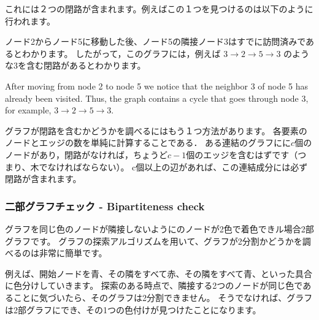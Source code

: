 これには２つの閉路が含まれます。例えばこの１つを見つけるのは以下のように行われます。
\begin{center}
\end{center}


ノード2からノード5に移動した後、ノード5の隣接ノード3はすでに訪問済みであるとわかります。
したがって，このグラフには，例えば
$3 \rightarrow 2 \rightarrow 5 \rightarrow 3$
のような3を含む閉路があるとわかります。

After moving from node 2 to node 5 we notice that
the neighbor 3 of node 5 has already been visited.
Thus, the graph contains a cycle that goes through node 3,
for example, $3 \rightarrow 2 \rightarrow 5 \rightarrow 3$.

グラフが閉路を含むかどうかを調べるにはもう１つ方法があります。
各要素のノードとエッジの数を単純に計算することである．
ある連結のグラフにに$c$個のノードがあり，閉路がなければ，ちょうど$c - 1$個のエッジを含むはずです（つまり、木でなければならない）。
c個以上の辺があれば、この連結成分には必ず閉路が含まれます。


\subsubsection{二部グラフチェック - Bipartiteness check}


グラフを同じ色のノードが隣接しないようにのノードが2色で着色できル場合2部グラフです。
グラフの探索アルゴリズムを用いて、グラフが2分割かどうかを調べるのは非常に簡単です。

例えば、開始ノードを青、その隣をすべて赤、その隣をすべて青、といった具合に色分けしていきます。
探索のある時点で、隣接する2つのノードが同じ色であることに気づいたら、そのグラフは2分割できません。
そうでなければ、グラフは2部グラフにでき、その1つの色付けが見つけたことになります。

